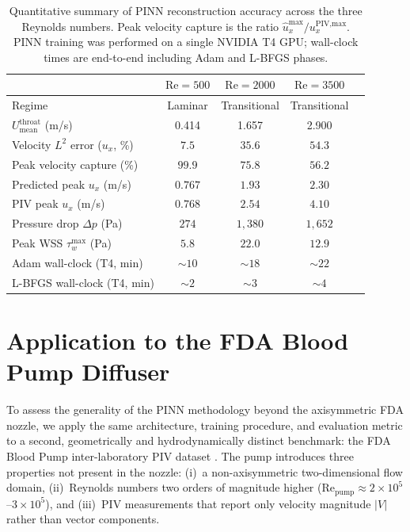 \documentclass[12pt,a4paper]{article}
\newcommand{\Reyn}{\mathrm{Re}}    %
\begin{document}
\begin{table}[H]
  \centering
  \caption{
    Quantitative summary of PINN reconstruction accuracy across the
    three Reynolds numbers. Peak velocity capture is the ratio
    $\hat{u}_x^{\max} / u_x^{\text{PIV,max}}$. PINN training was
    performed on a single NVIDIA T4 GPU; wall-clock times are
    end-to-end including Adam and L-BFGS phases.
  }
  \label{tab:results_summary}
  \begin{tabular}{lcccc}
    \toprule
                                       & $\Reyn = 500$ & $\Reyn = 2000$ & $\Reyn = 3500$ \\
    \midrule
    Regime                             & Laminar    & Transitional & Transitional \\
    $U_{\text{mean}}^{\text{throat}}$ (m/s) & 0.414  & 1.657 & 2.900 \\
    \midrule
    Velocity $L^2$ error ($u_x$, \%)      & $7.5$    & $35.6$    & $54.3$    \\
    Peak velocity capture (\%)            & $99.9$   & $75.8$    & $56.2$    \\
    Predicted peak $u_x$ (m/s)            & $0.767$  & $1.93$    & $2.30$    \\
    PIV peak $u_x$ (m/s)                  & $0.768$  & $2.54$    & $4.10$    \\
    \midrule
    Pressure drop $\Delta p$ (Pa)         & $274$    & $1{,}380$  & $1{,}652$  \\
    Peak WSS $\tau_w^{\max}$ (Pa)         & $5.8$    & $22.0$    & $12.9$    \\
    \midrule
    Adam wall-clock (T4, min)             & $\sim 10$ & $\sim 18$ & $\sim 22$ \\
    L-BFGS wall-clock (T4, min)           & $\sim 2$  & $\sim 3$  & $\sim 4$  \\
    \bottomrule
  \end{tabular}
\end{table}

\section{Application to the FDA Blood Pump Diffuser}
\label{sec:pump_application}

To assess the generality of the PINN methodology beyond the
axisymmetric FDA nozzle, we apply the same architecture, training
procedure, and evaluation metric to a second, geometrically and
hydrodynamically distinct benchmark: the FDA Blood Pump
inter-laboratory PIV dataset
\cite{Hariharan2018BloodPump, Malinauskas2017FDA}. The pump
introduces three properties not present in the nozzle: (i)~a
non-axisymmetric two-dimensional flow domain, (ii)~Reynolds numbers
two orders of magnitude higher
($\text{Re}_{\text{pump}} \approx 2 \times 10^5$--$3 \times 10^5$),
and (iii)~PIV measurements that report only velocity magnitude
$|V|$ rather than vector components.
\end{document}
